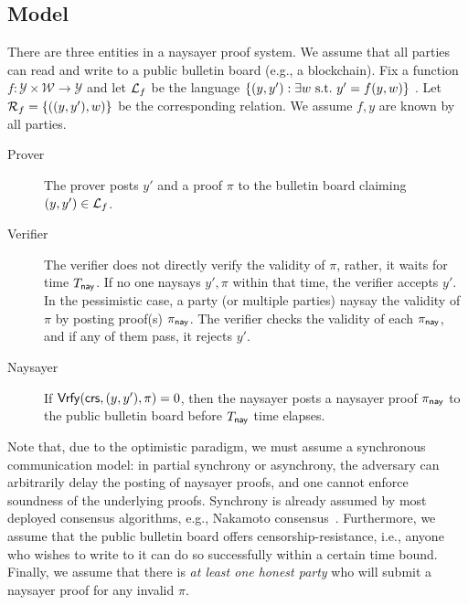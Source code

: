 \subsection{Model}

There are three entities in a naysayer proof system. We assume that all parties can read and write to a public bulletin board (e.g., a blockchain). Fix a function $f: \mathcal{Y} \times \mathcal{W} \to \mathcal{Y}$ and let $\mathcal{L}_f$ be the language $\{(y, y'): \exists w \mathrm{~s.t.~} y' = f(y, w)\}$ . Let $\mathcal{R}_f = \{((y, y'), w)\}$ be the corresponding relation. We assume $f,y$ are known by all parties.
\begin{description}
    \item[Prover] The prover posts $y'$ and a proof $\pi$ to the bulletin board claiming $(y,y') \in \mathcal{L}_f$. 
    \item[Verifier] The verifier does not directly verify the validity of $\pi$, rather, it waits for time $T_{\mathsf{nay}}$.
    If no one naysays $y', \pi$ within that time, the verifier accepts $y'$. In the pessimistic case, a party (or multiple parties) naysay the validity of $\pi$ by posting proof(s) $\pi_{\mathsf{nay}}$. The verifier checks the validity of each $\pi_{\mathsf{nay}}$, and if any of them pass, it rejects $y'$.
    \item[Naysayer] If $\mathsf{Vrfy}(\mathsf{crs}, (y,y'),\pi)=0$, then the naysayer posts a naysayer proof $\pi_{\mathsf{nay}}$ to the public bulletin board before $T_{\mathsf{nay}}$ time elapses.
\end{description}

Note that, due to the optimistic paradigm, we must assume a synchronous communication model: in partial synchrony or asynchrony, the adversary can arbitrarily delay the posting of naysayer proofs, and one cannot enforce soundness of the underlying proofs. Synchrony is already assumed by most deployed consensus algorithms, e.g., Nakamoto consensus~\cite{Nakamoto08}.  Furthermore, we assume that the public bulletin board offers censorship-resistance, i.e., anyone who wishes to write to it can do so successfully within a certain time bound. Finally, we assume that there is \emph{at least one honest party} who will submit a naysayer proof for any invalid $\pi$.